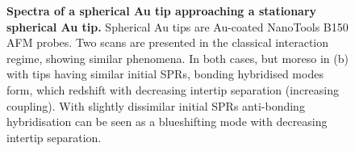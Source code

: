 \documentclass[a4paper]{article}
\begin{document}
\begin{figure}[bt]
\centering
{}
\caption[Spectra of a spherical Au tip approaching a stationary spherical Au tip]{\textbf{Spectra of a spherical Au tip approaching a stationary spherical Au tip.} Spherical Au tips are Au-coated NanoTools B150 AFM probes. Two scans are presented in the classical interaction regime, showing similar phenomena. In both cases, but moreso in (b) with tips having similar initial SPRs, bonding hybridised modes form, which redshift with decreasing intertip separation (increasing coupling). With slightly dissimilar initial SPRs anti-bonding hybridisation can be seen as a blueshifting mode with decreasing intertip separation.}
\label{fig:spherical_tip_dimer_scan}
\end{figure}
\end{document}
